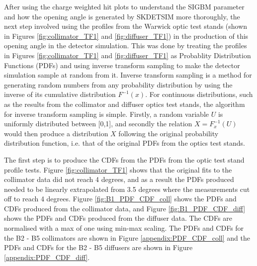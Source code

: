 After using the charge weighted hit plots to understand the SIGBM parameter and how the opening angle is generated by SKDETSIM more thoroughly, the next step involved using the profiles from the Warwick optic test stands (shown in Figures \ref{fig:collimator_TF1} and \ref{fig:diffuser_TF1}) in the production of this opening angle in the detector simulation. This was done by treating the profiles in Figures \ref{fig:collimator_TF1} and \ref{fig:diffuser_TF1} as Probablity Distribution Functions (PDFs) and using inverse transform sampling to make the detector simulation sample at random from it. Inverse transform sampling is a method for generating random numbers from any probability distribution by using the inverse of its cumulative distribution $F^{-1}(x)$. For continuous distributions, such as the results from the collimator and diffuser optics test stands, the algorithm for inverse transform sampling is simple. Firstly, a random variable $U$ is uniformly distributed between [0,1], and secondly the relation $X = F^{-1}_{x}(U)$ would then produce a distribution $X$ following the original probability distribution function, i.e. that of the original PDFs from the optics test stands. 

The first step is to produce the CDFs from the PDFs from the optic test stand profile tests. Figure \ref{fig:collimator_TF1} shows that the original fits to the collimator data did not reach 4 degrees, and as a result the PDFs produced needed to be linearly extrapolated from 3.5 degrees where the measurements cut off to reach 4 degrees. Figure \ref{fig:B1_PDF_CDF_coll} shows the PDFs and CDFs produced from the collimator data, and Figure \ref{fig:B1_PDF_CDF_diff} shows the PDFs and CDFs produced from the diffuser data. The CDFs are normalised with a max of one using min-max scaling. The PDFs and CDFs for the B2 - B5 collimators are shown in Figure \ref{appendix:PDF_CDF_coll} and the PDFs and CDFs for the B2 - B5 diffusers are shown in Figure \ref{appendix:PDF_CDF_diff}.


